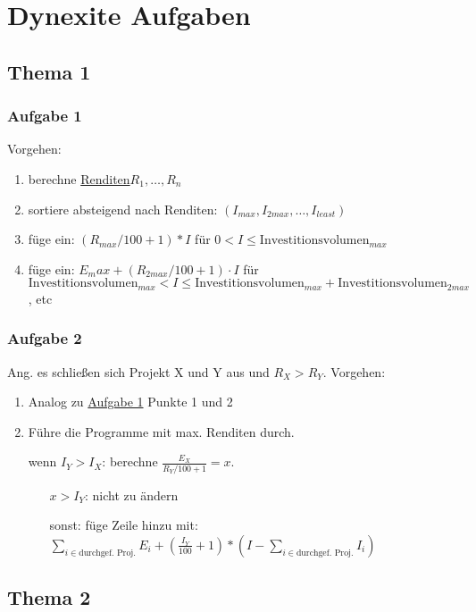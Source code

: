 \section{Dynexite Aufgaben}
	\subsection*{Thema 1}
		\subsubsection*{Aufgabe 1}
		\label{Thema1Aufgabe1} Vorgehen:
		\begin{enumerate}
			\setlength{\itemindent}{1cm}
			\item berechne \hyperref[Rendite]{Renditen}$R_1,\dots, R_n$
			\item sortiere absteigend nach Renditen: $(I_{max},I_{2max},\dots,I_{least})$
			\item füge ein: $(R_{max}/100+1)*I$ für $0 < I \le \text{Investitionsvolumen}_{max}$
			\item füge ein: $E_max + (R_{2max}/100+1)\cdot I$ für \\ $\text{Investitionsvolumen}_{max} < I \le \text{Investitionsvolumen}_{max}+\text{Investitionsvolumen}_{2max}$, etc 
		\end{enumerate}
		\subsubsection*{Aufgabe 2}
		Ang. es schließen sich Projekt X und Y aus und $R_X>R_Y$. Vorgehen:
		\begin{enumerate}
			\setlength{\itemindent}{1cm}
			\item Analog zu \hyperref[Thema1Aufgabe1]{Aufgabe 1} Punkte 1 und 2
			\item Führe die Programme mit max. Renditen durch.
			\item[\red{!Wichtig!}] wenn $I_Y>I_X$: berechne $\frac{E_X}{R_Y/100+1} =x$.
				\begin{itemize}
					\setlength{\itemindent}{2cm}
					\item[$x>I_Y$:] nicht zu ändern
					\item[sonst:] füge Zeile hinzu mit: ${\sum_{i\in\text{durchgef. Proj.}}E_i} + (\frac{I_Y}{100}+1)*(I-\sum_{i\in\text{durchgef. Proj.}}I_i)$
				\end{itemize}
		\end{enumerate}
	\subsection*{Thema 2}
